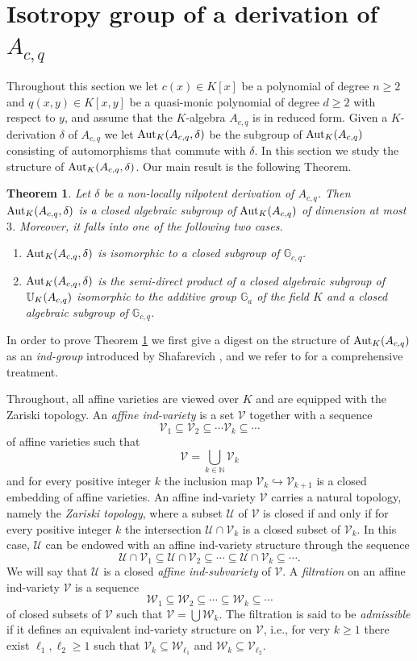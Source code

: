 \documentclass{article}
\newcommand \N {\mathbb{N}}
\newcommand \G {\mathbb{G}}
\newcommand \U {\mathcal{U}}
\newcommand \V {\mathcal{V}}
\newcommand \W {\mathcal{W}}
\renewcommand \a {A}
\renewcommand \k {K}
\newcommand \saut {{\rm \mathbb{U}}}
\newcommand \auto {{\rm Aut}}
\newtheorem{theorem}{Theorem}
\begin{document}
{\section{Isotropy group of a derivation of $\a_{c,q}$}
Throughout this section we let $c(x)\in\k[x]$ be a polynomial of degree $n\geq 2$ and $q(x,y)\in\k[x,y]$ be a quasi-monic polynomial of degree $d\geq 2$ with respect to $y$, and assume that the $\k$-algebra $\a_{c,q}$ is in reduced form. Given a $\k$-derivation $\delta$ of $\a_{c,q}$ we let $\auto_{\k}(\a_{c,q},\delta)$ be the subgroup of $\auto_{\k}(\a_{c,q})$ consisting of automorphisms that commute with $\delta$. In this section we study the structure of $\auto_{\k}(\a_{c,q},\delta)$. Our main result is the following Theorem.
\begin{theorem}\label{isotropyGroupTheorem}Let $\delta$ be a non-locally nilpotent derivation of $\a_{c,q}$. Then  $\auto_{\k}(\a_{c,q},\delta)$ is a closed algebraic subgroup of $\auto_{\k}(\a_{c,q})$ of dimension at most $3$. Moreover, it falls into one of the following two cases.
	\begin{enumerate}[1.]
		\item $\auto_{\k}(\a_{c,q},\delta)$ is isomorphic to a closed subgroup of $\G_{c,q}$.
		\item $\auto_{\k}(\a_{c,q},\delta)$ is the semi-direct product of a closed algebraic subgroup of $\saut_{\k}(\a_{c,q})$ isomorphic to the additive group $\G_a$ of the field $\k$ and a closed algebraic subgroup of $\G_{c,q}$.
	\end{enumerate}
\end{theorem}
In order to prove Theorem \ref{isotropyGroupTheorem} we first give a digest on the structure of $\auto_{\k}(\a_{c,q})$ as an {\it ind-group} introduced by Shafarevich \cite{shafarevich_1966}, and we refer to \cite{zaidenberg_2017,furterKraft_2018} for a comprehensive treatment.

\medskip Throughout, all affine varieties are viewed over $\k$ and are equipped with the Zariski topology. An {\it affine ind-variety} is a set $\V$ together with a sequence $$\V_1\subseteq \V_2\subseteq \cdots \V_k\subseteq \cdots$$ of affine varieties such that $$\V=\displaystyle{\bigcup_{k\in\N}\V_k}$$ and for every positive integer $k$ the inclusion map $\V_k\hookrightarrow\V_{k+1}$ is a closed embedding of affine varieties. An affine ind-variety $\V$ carries a natural topology, namely the {\it Zariski topology}, where a subset $\U$ of $\V$ is closed if and only if for every positive integer $k$ the intersection $\U\cap \V_k$ is a closed subset of $\V_k$. In this case, $\U$ can be endowed with an affine ind-variety structure through the sequence $$\U\cap\V_1\subseteq \U\cap\V_2\subseteq \cdots\subseteq \U\cap\V_k\subseteq \cdots.$$ We will say that $\U$ is a closed {\it affine ind-subvariety} of $\V$. A {\it filtration} on an affine ind-variety $\V$ is a sequence $$\W_1\subseteq \W_2\subseteq \cdots \subseteq \W_k\subseteq \cdots$$ of closed subsets of $\V$ such that $\V=\bigcup\W_k$. The filtration is said to be {\it admissible} if it defines an equivalent ind-variety structure on $\V$, i.e., for very $k\geq 1$ there exist $\ell_1,\ell_2\geq 1$ such that $\V_k\subseteq \W_{\ell_1}$ and $\W_k\subseteq \V_{\ell_2}$.

}
\end{document}
